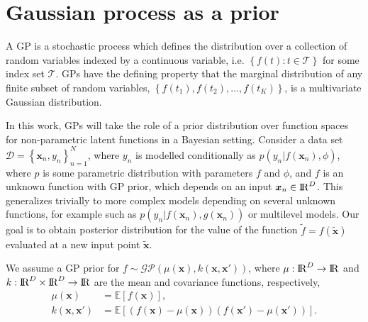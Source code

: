 \documentclass[onecolumn,a4paper,11pt]{article}
\begin{document}
\section{Gaussian process as a prior}\label{ch4_gp}

A GP is a stochastic process which defines the distribution over a collection of random variables indexed by a continuous variable, i.e. $\left\lbrace f(t): t \in \mathcal{T}\right\rbrace$ for some index set $\mathcal{T}$. GPs have the defining property that the marginal distribution of any finite subset of random variables, $\left\lbrace f(t_1), f(t_2), \hdots, f(t_K) \right\rbrace$, is a multivariate Gaussian distribution.

In this work, GPs will take the role of a prior distribution over function spaces for non-parametric latent functions in a Bayesian setting. 
Consider a data set $\mathcal{D} = \left\lbrace \bm{x}_n, y_n \right\rbrace_{n=1}^N$, where $y_n$ is modelled conditionally as $p(y_n|f(\bm{x}_n),\phi)$, where $p$ is some parametric distribution with parameters $f$ and $\phi$, and $f$ is an unknown function with GP prior, which depends on an input $\bm{x}_n\in {\rm I\!R}^D$. This generalizes trivially to more complex models depending on several unknown functions, for example such as $p(y_n|f(\bm{x}_n),g(\bm{x}_n))$ or multilevel models. Our goal is to obtain posterior distribution for the value of the function $\tilde{f}=f(\tilde{\bm{x}})$  evaluated at a new input point $\tilde{\bm{x}}$.

We assume a GP prior for $f \sim \mathcal{GP}(\mu(\bm{x}), k(\bm{x}, \bm{x}'))$, where $\mu: {\rm I\!R}^D \rightarrow {\rm I\!R}$ and $k: {\rm I\!R}^D \times {\rm I\!R}^D \rightarrow {\rm I\!R}$ are the mean and covariance functions, respectively,
%
\begin{align*}
 	\mu(\bm{x}) &= \mathbb{E}\!\left[f(\bm{x})\right],\\ 
 	k(\bm{x}, \bm{x}') &= \mathbb{E}\!\left[\left( f(\bm{x}) - \mu(\bm{x}) \right)\left( f(\bm{x}') - \mu(\bm{x}') \right)\right].
\end{align*} 
\end{document}
